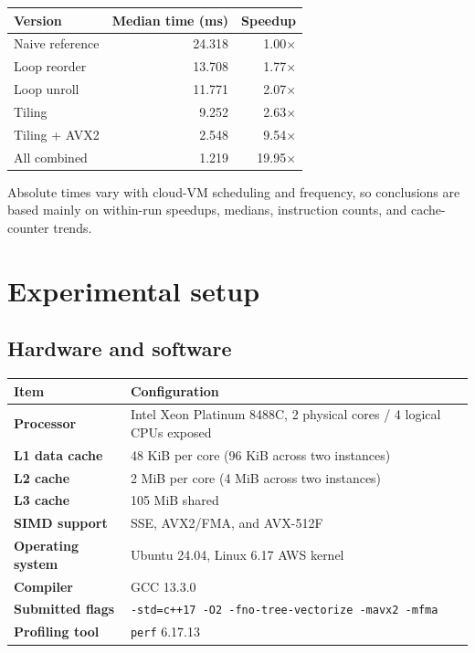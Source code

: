 \documentclass[10pt,letterpaper]{article}
\begin{document}
\begin{center}
\begin{tabular}{lrr}
\toprule
\textbf{Version} & \textbf{Median time (ms)} & \textbf{Speedup} \\
\midrule
Naive reference & 24.318 & 1.00$\times$ \\
Loop reorder & 13.708 & 1.77$\times$ \\
Loop unroll & 11.771 & 2.07$\times$ \\
Tiling & 9.252 & 2.63$\times$ \\
Tiling + AVX2 & 2.548 & 9.54$\times$ \\
All combined & 1.219 & 19.95$\times$ \\
\bottomrule
\end{tabular}
\end{center}

Absolute times vary with cloud-VM scheduling and frequency, so conclusions are based mainly on within-run speedups, medians, instruction counts, and cache-counter trends.

\section{Experimental setup}

\subsection{Hardware and software}

\begin{center}
\begin{tabularx}{\textwidth}{>{\bfseries}p{}X}
\toprule
Item & Configuration \\
\midrule
Processor & Intel Xeon Platinum 8488C, 2 physical cores / 4 logical CPUs exposed \\
L1 data cache & 48 KiB per core (96 KiB across two instances) \\
L2 cache & 2 MiB per core (4 MiB across two instances) \\
L3 cache & 105 MiB shared \\
SIMD support & SSE, AVX2/FMA, and AVX-512F \\
Operating system & Ubuntu 24.04, Linux 6.17 AWS kernel \\
Compiler & GCC 13.3.0 \\
Submitted flags & \texttt{-std=c++17 -O2 -fno-tree-vectorize -mavx2 -mfma} \\
Profiling tool & \texttt{perf} 6.17.13 \\
\bottomrule
\end{tabularx}
\end{center}
\end{document}
